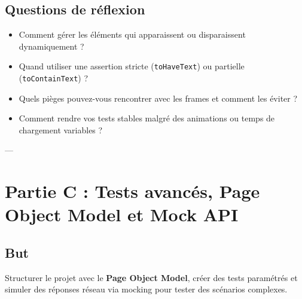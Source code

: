 \documentclass[a4paper,12pt]{article}
\begin{document}
\subsection*{Questions de réflexion}
\begin{itemize}
\item Comment gérer les éléments qui apparaissent ou disparaissent dynamiquement ?
\item Quand utiliser une assertion stricte (\texttt{toHaveText}) ou partielle (\texttt{toContainText}) ?
\item Quels pièges pouvez-vous rencontrer avec les frames et comment les éviter ?
\item Comment rendre vos tests stables malgré des animations ou temps de chargement variables ?
\end{itemize}

---

\newpage
\section*{Partie C : Tests avancés, Page Object Model et Mock API}
\subsection*{But}
Structurer le projet avec le \textbf{Page Object Model}, créer des tests paramétrés et simuler des réponses réseau via mocking pour tester des scénarios complexes.
\end{document}
